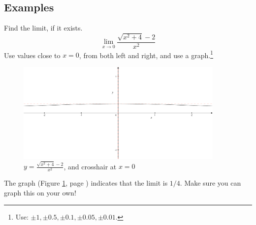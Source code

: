 \documentclass[12pt,addpoints, answers, fleqn]{exam}
\begin{document}
\subsection{Examples}




 




\begin{questions}
\question Find the limit, if it exists.
\[
\mathop {\lim }\limits_{x \to 0 }  \frac{\sqrt{x^2+4} -2}{x^2}
\]
Use values close to $x=0$, from both left and right, and use a graph.\footnote{Use: $\pm 1,\pm 0.5,\pm 0.1,\pm 0.05,\pm 0.01$.}
\begin{figure}[htbp] %
   \centering
   \includegraphics[width=4in]{./graphics/graph020105.pdf} 
   \caption{$\displaystyle y = \frac{\sqrt{x^2+4} -2}{x^2}$, and crosshair at $x=0$}
   \label{fig:graph020105}
\end{figure}

\begin{solution}
The graph (Figure \ref{fig:graph020105}, page \pageref{fig:graph020105}) indicates that the limit is $1/4$. Make sure you can graph this on your own!


\end{solution}
\end{questions}
\end{document}
